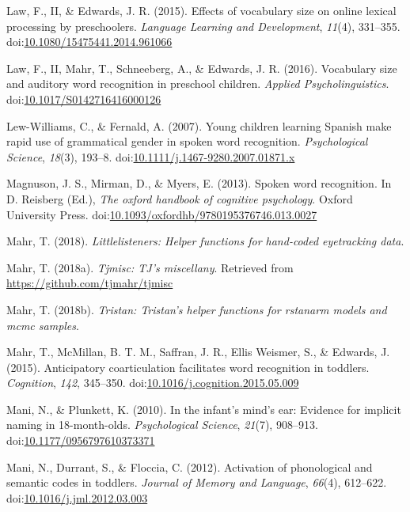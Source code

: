 \documentclass [11pt, proquest] {uwthesis}[2015/03/03]
\begin{document}
\hypertarget{ref-MPPaper}{}
Law, F., II, \& Edwards, J. R. (2015). Effects of vocabulary size on
online lexical processing by preschoolers. \emph{Language Learning and
Development}, \emph{11}(4), 331--355.
doi:\href{https://doi.org/10.1080/15475441.2014.961066}{10.1080/15475441.2014.961066}

\hypertarget{ref-RWLPaper}{}
Law, F., II, Mahr, T., Schneeberg, A., \& Edwards, J. R. (2016).
Vocabulary size and auditory word recognition in preschool children.
\emph{Applied Psycholinguistics}.
doi:\href{https://doi.org/10.1017/S0142716416000126}{10.1017/S0142716416000126}

\hypertarget{ref-Lew-Williams2007}{}
Lew-Williams, C., \& Fernald, A. (2007). Young children learning Spanish
make rapid use of grammatical gender in spoken word recognition.
\emph{Psychological Science}, \emph{18}(3), 193--8.
doi:\href{https://doi.org/10.1111/j.1467-9280.2007.01871.x}{10.1111/j.1467-9280.2007.01871.x}

\hypertarget{ref-Magnuson2013}{}
Magnuson, J. S., Mirman, D., \& Myers, E. (2013). Spoken word
recognition. In D. Reisberg (Ed.), \emph{The oxford handbook of
cognitive psychology}. Oxford University Press.
doi:\href{https://doi.org/10.1093/oxfordhb/9780195376746.013.0027}{10.1093/oxfordhb/9780195376746.013.0027}

\hypertarget{ref-R-littlelisteners}{}
Mahr, T. (2018). \emph{Littlelisteners: Helper functions for hand-coded
eyetracking data}.

\hypertarget{ref-R-tjmisc}{}
Mahr, T. (2018a). \emph{Tjmisc: TJ's miscellany}. Retrieved from
\url{https://github.com/tjmahr/tjmisc}

\hypertarget{ref-R-tristan}{}
Mahr, T. (2018b). \emph{Tristan: Tristan's helper functions for rstanarm
models and mcmc samples}.

\hypertarget{ref-Mahr2015}{}
Mahr, T., McMillan, B. T. M., Saffran, J. R., Ellis Weismer, S., \&
Edwards, J. (2015). Anticipatory coarticulation facilitates word
recognition in toddlers. \emph{Cognition}, \emph{142}, 345--350.
doi:\href{https://doi.org/10.1016/j.cognition.2015.05.009}{10.1016/j.cognition.2015.05.009}

\hypertarget{ref-Mani2010}{}
Mani, N., \& Plunkett, K. (2010). In the infant's mind's ear: Evidence
for implicit naming in 18-month-olds. \emph{Psychological Science},
\emph{21}(7), 908--913.
doi:\href{https://doi.org/10.1177/0956797610373371}{10.1177/0956797610373371}

\hypertarget{ref-Mani2012}{}
Mani, N., Durrant, S., \& Floccia, C. (2012). Activation of phonological
and semantic codes in toddlers. \emph{Journal of Memory and Language},
\emph{66}(4), 612--622.
doi:\href{https://doi.org/10.1016/j.jml.2012.03.003}{10.1016/j.jml.2012.03.003}
\end{document}
